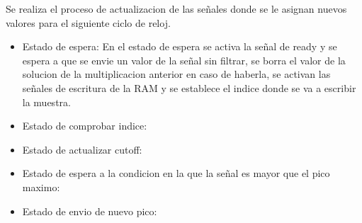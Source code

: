 Se realiza el proceso de actualizacion de las señales donde se le asignan nuevos valores para el siguiente ciclo de reloj.

\begin{itemize}
    \item Estado de espera: En el estado de espera se activa la señal de ready y se espera a que se envie un valor de la
    señal sin filtrar, se borra el valor de la solucion de la multiplicacion anterior en caso de haberla, se activan las
    señales de escritura de la RAM y se establece el indice donde se va a escribir la muestra.
    \item Estado de comprobar indice: 
    \item Estado de actualizar cutoff:
    \item Estado de espera a la condicion en la que la señal es mayor que el pico maximo: 
    \item Estado de envio de nuevo pico:
\end{itemize}
\lstset{language=VHDL, breaklines=true, basicstyle=\footnotesize}
